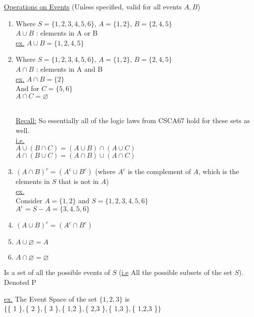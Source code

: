\documentclass[12pt]{article}
\begin{document}
	\underline{Operations on Events} (Unless specified, valid for all events $A,B$)
	\begin{enumerate}
		\item{
		Where $S = \{ 1,2,3,4,5,6 \}$, $A =  \{ 1,2 \}$, $B = \{ 2,4,5 \}$\\
		$A \cup B$ : elements in A or B\\
		\underline{ex.}
		$A \cup B = \{ 1,2,4,5 \}$
		}
		\item{
		Where $S = \{ 1,2,3,4,5,6 \}$, $A =  \{ 1,2 \}$, $B = \{ 2,4,5 \}$\\
		$A \cap B$ : elements in A and B\\
		\underline{ex.} $A \cap B = \{ 2 \}$\\
		And for $C = \{ 5,6 \}$\\
		$A \cap C = \varnothing$\\
		\\
		\begin{tcolorbox}
		\underline{Recall:} So essentially all of the logic laws from CSCA67 hold for these sets as well.\\
		\underline{i.e.}\\
		$A \cup (B \cap C) = (A \cup B) \cap (A \cup C)$\\
		$A \cap (B \cup C) = (A \cap B) \cup (A \cap C)$
		\end{tcolorbox}
		}
		\item{
		$(A \cap B)^c = (A^c \cup B^c)$ (where $A^c$ is the complement of $A$, which is the elements in $S$ that is not in $A$)\\
		\underline{ex.}\\
		Consider $A = \{ 1,2 \}$ and $S = \{ 1,2,3,4,5,6 \}$\\
		$A^c = S - A = \{ 3,4,5,6 \}$
		}
		\item{
		$(A \cup B)^c = (A^c \cap B^c)$
		}
		\item{
		$A \cup \varnothing = A$
		}
		\item{
		$A \cap \varnothing = \varnothing$
		}
	\end{enumerate}


	\begin{tcolorbox}[title=Event Space] Is a set of all the possible events of $S$ (\underline{i.e} All the possible subsets of the set $S$). Denoted P
	\end{tcolorbox}
	\underline{ex.}
	The Event Space of the set $\{ 1,2,3 \}$ is\\
	$\{ $\{ 1 \}$,$\{ 2 \}$,$\{ 3 \}$, $\{ 1,2 \}$, $\{ 2,3 \}$, $\{ 1,3 \}$, $\{ 1,2,3 \}$ \}$
\end{document}
